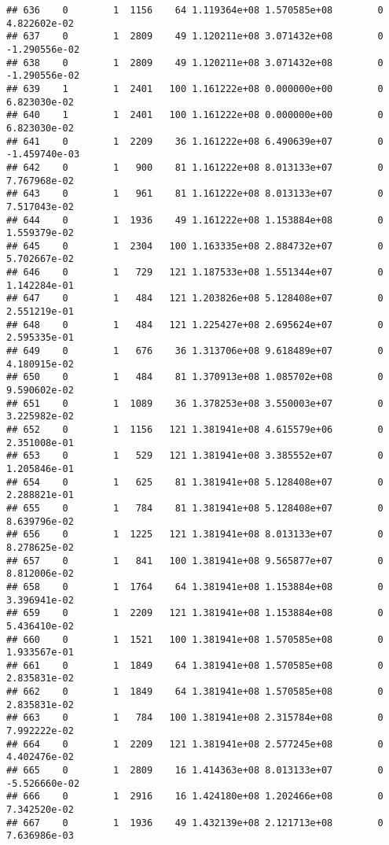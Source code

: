 \documentclass[
]{article}
\begin{document}
\begin{enumerate}
\begin{verbatim}
## 636    0        1  1156    64 1.119364e+08 1.570585e+08        0  4.822602e-02
## 637    0        1  2809    49 1.120211e+08 3.071432e+08        0 -1.290556e-02
## 638    0        1  2809    49 1.120211e+08 3.071432e+08        0 -1.290556e-02
## 639    1        1  2401   100 1.161222e+08 0.000000e+00        0  6.823030e-02
## 640    1        1  2401   100 1.161222e+08 0.000000e+00        0  6.823030e-02
## 641    0        1  2209    36 1.161222e+08 6.490639e+07        0 -1.459740e-03
## 642    0        1   900    81 1.161222e+08 8.013133e+07        0  7.767968e-02
## 643    0        1   961    81 1.161222e+08 8.013133e+07        0  7.517043e-02
## 644    0        1  1936    49 1.161222e+08 1.153884e+08        0  1.559379e-02
## 645    0        1  2304   100 1.163335e+08 2.884732e+07        0  5.702667e-02
## 646    0        1   729   121 1.187533e+08 1.551344e+07        0  1.142284e-01
## 647    0        1   484   121 1.203826e+08 5.128408e+07        0  2.551219e-01
## 648    0        1   484   121 1.225427e+08 2.695624e+07        0  2.595335e-01
## 649    0        1   676    36 1.313706e+08 9.618489e+07        0  4.180915e-02
## 650    0        1   484    81 1.370913e+08 1.085702e+08        0  9.590602e-02
## 651    0        1  1089    36 1.378253e+08 3.550003e+07        0  3.225982e-02
## 652    0        1  1156   121 1.381941e+08 4.615579e+06        0  2.351008e-01
## 653    0        1   529   121 1.381941e+08 3.385552e+07        0  1.205846e-01
## 654    0        1   625    81 1.381941e+08 5.128408e+07        0  2.288821e-01
## 655    0        1   784    81 1.381941e+08 5.128408e+07        0  8.639796e-02
## 656    0        1  1225   121 1.381941e+08 8.013133e+07        0  8.278625e-02
## 657    0        1   841   100 1.381941e+08 9.565877e+07        0  8.812006e-02
## 658    0        1  1764    64 1.381941e+08 1.153884e+08        0  3.396941e-02
## 659    0        1  2209   121 1.381941e+08 1.153884e+08        0  5.436410e-02
## 660    0        1  1521   100 1.381941e+08 1.570585e+08        0  1.933567e-01
## 661    0        1  1849    64 1.381941e+08 1.570585e+08        0  2.835831e-02
## 662    0        1  1849    64 1.381941e+08 1.570585e+08        0  2.835831e-02
## 663    0        1   784   100 1.381941e+08 2.315784e+08        0  7.992222e-02
## 664    0        1  2209   121 1.381941e+08 2.577245e+08        0  4.402476e-02
## 665    0        1  2809    16 1.414363e+08 8.013133e+07        0 -5.526660e-02
## 666    0        1  2916    16 1.424180e+08 1.202466e+08        0  7.342520e-02
## 667    0        1  1936    49 1.432139e+08 2.121713e+08        0  7.636986e-03

\end{verbatim}
\end{enumerate}
\end{document}
